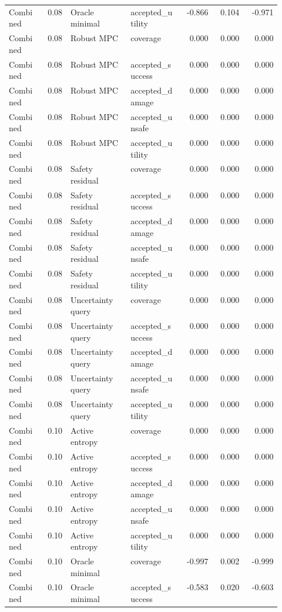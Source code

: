 \documentclass{article}
\begin{document}
\begin{center}
\begin{longtable}{p{0.13\linewidth}rp{0.22\linewidth}p{0.19\linewidth}rrr}
Combined & 0.08 & Oracle minimal & accepted\_utility & -0.866 & 0.104 & -0.971\\
Combined & 0.08 & Robust MPC & coverage & 0.000 & 0.000 & 0.000\\
Combined & 0.08 & Robust MPC & accepted\_success & 0.000 & 0.000 & 0.000\\
Combined & 0.08 & Robust MPC & accepted\_damage & 0.000 & 0.000 & 0.000\\
Combined & 0.08 & Robust MPC & accepted\_unsafe & 0.000 & 0.000 & 0.000\\
Combined & 0.08 & Robust MPC & accepted\_utility & 0.000 & 0.000 & 0.000\\
Combined & 0.08 & Safety residual & coverage & 0.000 & 0.000 & 0.000\\
Combined & 0.08 & Safety residual & accepted\_success & 0.000 & 0.000 & 0.000\\
Combined & 0.08 & Safety residual & accepted\_damage & 0.000 & 0.000 & 0.000\\
Combined & 0.08 & Safety residual & accepted\_unsafe & 0.000 & 0.000 & 0.000\\
Combined & 0.08 & Safety residual & accepted\_utility & 0.000 & 0.000 & 0.000\\
Combined & 0.08 & Uncertainty query & coverage & 0.000 & 0.000 & 0.000\\
Combined & 0.08 & Uncertainty query & accepted\_success & 0.000 & 0.000 & 0.000\\
Combined & 0.08 & Uncertainty query & accepted\_damage & 0.000 & 0.000 & 0.000\\
Combined & 0.08 & Uncertainty query & accepted\_unsafe & 0.000 & 0.000 & 0.000\\
Combined & 0.08 & Uncertainty query & accepted\_utility & 0.000 & 0.000 & 0.000\\
Combined & 0.10 & Active entropy & coverage & 0.000 & 0.000 & 0.000\\
Combined & 0.10 & Active entropy & accepted\_success & 0.000 & 0.000 & 0.000\\
Combined & 0.10 & Active entropy & accepted\_damage & 0.000 & 0.000 & 0.000\\
Combined & 0.10 & Active entropy & accepted\_unsafe & 0.000 & 0.000 & 0.000\\
Combined & 0.10 & Active entropy & accepted\_utility & 0.000 & 0.000 & 0.000\\
Combined & 0.10 & Oracle minimal & coverage & -0.997 & 0.002 & -0.999\\
Combined & 0.10 & Oracle minimal & accepted\_success & -0.583 & 0.020 & -0.603\\

\end{longtable}
\end{center}
\end{document}
